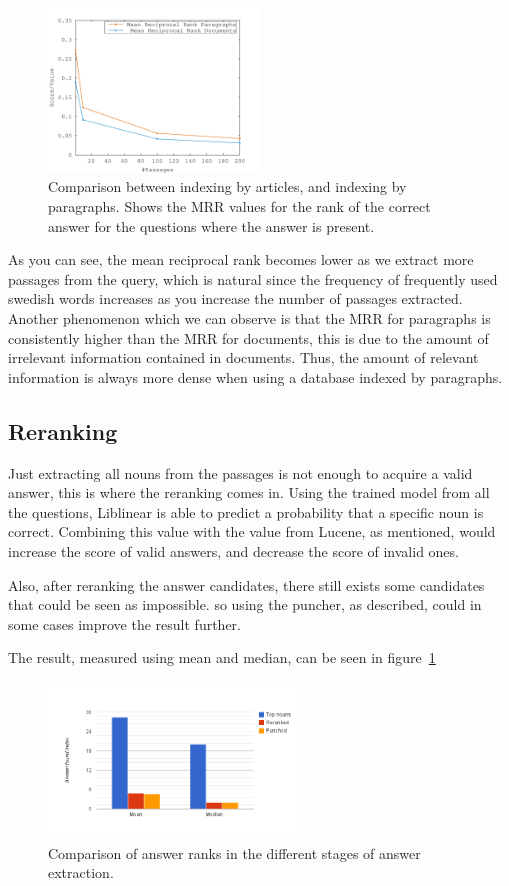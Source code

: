 \begin{figure}[h!]
  \centering
  \includegraphics[width=0.5\textwidth]{figures/median.pdf}
  \caption{Comparison between indexing by articles, and indexing by paragraphs. 
  Shows the MRR values for the rank of the correct answer for the questions where 
  the answer is present.}
\end{figure}

As you can see, the mean reciprocal rank becomes lower as we extract more passages from the query, which
is natural since the frequency of frequently used swedish words increases as you increase the number
of passages extracted. Another phenomenon which we can observe is that the MRR for 
paragraphs is consistently higher than the MRR for documents, this is due to the amount of irrelevant
information contained in documents. Thus, the amount of relevant information is always more dense when
using a database indexed by paragraphs.

\subsection{Reranking}
Just extracting all nouns from the passages is not enough to acquire a valid answer, this is where the reranking comes in.
Using the trained model from all the questions, Liblinear is able to predict a probability that a specific noun is correct.
Combining this value with the value from Lucene, as mentioned, would increase the score of valid answers, and decrease the score of invalid ones.

Also, after reranking the answer candidates, there still exists some candidates that could be seen as impossible.
so using the puncher, as described, could in some cases improve the result further.

The result, measured using mean and median, can be seen in figure~\ref{fig:meanmedian}

\begin{figure}[h!]
  \centering
  \hspace*{-0.6cm}
  \includegraphics[width=0.6\textwidth]{figures/meanMedian.png}
  \caption{Comparison of answer ranks in the different stages of answer extraction.}
  \label{fig:meanmedian}
\end{figure}

